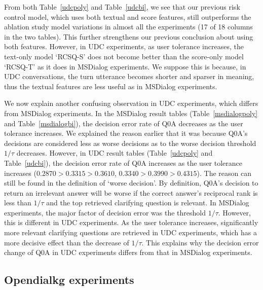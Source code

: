 \documentclass[format=acmsmall, review=False, screen=true]{acmart}
\begin{document}
From both Table~\ref{udcpoly} and Table~\ref{udcbi}, we see that our previous risk control model, which uses both textual and score features, still outperforms the ablation study model variations in almost all the experiments (17 of 18 columns in the two tables). This further strengthens our previous conclusion about using both features. However, in UDC experiments, as user tolerance increases, the text-only model `RCSQ-S' does not become better than the score-only model `RCSQ-T' as it does in MSDialog experiments. We suppose this is because, in UDC conversations, the turn utterance becomes shorter and sparser in meaning, thus the textual features are less useful as in MSDialog experiments.

We now explain another confusing observation in UDC experiments, which differs from MSDialog experiments. In the MSDialog result tables (Table~\ref{msdialogpoly} and Table~\ref{msdialogbi}), the decision error rate of Q0A decreases as the user tolerance increases. We explained the reason earlier that it was because Q0A's decisions are considered less as worse decisions as to the worse decision threshold $1/\tau$ decreases. However, in UDC result tables (Table~\ref{udcpoly} and Table~\ref{udcbi}), the decision error rate of Q0A increases as the user tolerance increases ($0.2870>0.3315>0.3610$, $0.3340>0.3990>0.4315$). The reason can still be found in the definition of `worse decision'. By definition, Q0A's decision to return an irrelevant answer will be worse if the correct answer's reciprocal rank is less than $1/\tau$ and the top retrieved clarifying question is relevant. In MSDialog experiments, the major factor of decision error was the threshold $1/\tau$. However, this is different in UDC experiments. As the user tolerance increases, significantly more relevant clarifying questions are retrieved in UDC experiments, which has a more decisive effect than the decrease of $1/\tau$. This explains why the decision error change of Q0A in UDC experiments differs from that in MSDialog experiments.


\subsection{Opendialkg experiments}
\end{document}
